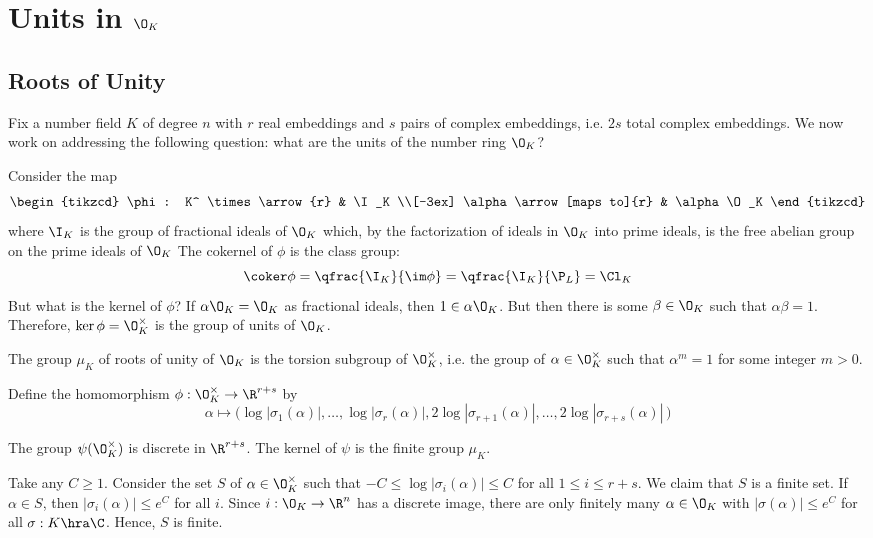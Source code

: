 
\section{Units in $\O_K$}
\subsection{Roots of Unity}

Fix a number field $K$ of degree $n$ with $r$ real embeddings and $s$ pairs of complex embeddings, i.e. $2s$ total complex embeddings. We now work on addressing the following question: what are the units of the number ring $\O_K$?

Consider the map
	\[
	\begin{tikzcd}
	\phi: K^ \times \arrow{r} & \I_K \\[-3ex]
	\alpha \arrow[maps to]{r} & \alpha \O_K
	\end{tikzcd}
	\]
where $\I_K$ is the group of fractional ideals of $\O_K$ which, by the factorization of ideals in $\O_K$ into prime ideals, is the free abelian group on the prime ideals of $\O_K$ The cokernel of $\phi$ is the class group:
	\[
	\coker \phi = \qfrac{\I_K}{\im \phi} = \qfrac{\I_K}{\P_L}= \Cl_K
	\]
But what is the kernel of $\phi$? If $\alpha \O_K= \O_K$ as fractional ideals, then $1 \in \alpha \O_K$. But then there is some $\beta \in \O_K$ such that $\alpha \beta =1$. Therefore, $\ker \phi= \O_K^\times$ is the group of units of $\O_K$. 


\begin{dfn}
The group $\mu_K$ of roots of unity of $\O_K$ is the torsion subgroup of $\O_K^\times$, i.e. the group of $\alpha \in \O_K^\times$ such that $\alpha^m=1$ for some integer $m>0$. 
\end{dfn}

Define the homomorphism $\phi: \O_K^\times \to \R^{r+s}$ by
	\[
	\alpha \mapsto \big( \log |\sigma_1(\alpha)|, \ldots, \log |\sigma_r(\alpha)|, 2 \log |\sigma_{r+1}(\alpha)|, \ldots, 2 \log |\sigma_{r+s}(\alpha)| \, \big)
	\]

\begin{prop}
The group $\psi(\O_K^\times)$ is discrete in $\R^{r+s}$. The kernel of $\psi$ is the finite group $\mu_K$. 
\end{prop}

\pf Take any $C \geq 1$. Consider the set $S$ of $\alpha \in \O_K^\times$ such that $-C \leq \log |\sigma_i(\alpha)| \leq C$ for all $1 \leq i \leq r+s$. We claim that $S$ is a finite set. If $\alpha \in S$, then $|\sigma_i(\alpha)| \leq e^C$ for all $i$. Since $i: \O_K \to \R^n$ has a discrete image, there are only finitely many $\alpha \in \O_K$ with $|\sigma(\alpha)| \leq e^C$ for all $\sigma: K \hra \C$. Hence, $S$ is finite.

